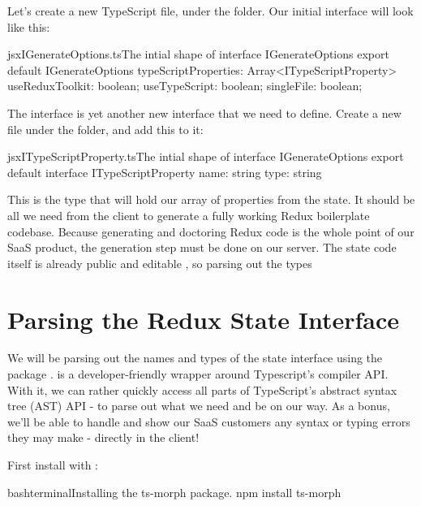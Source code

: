 \documentclass[paper=6in:9in,pagesize=pdftex,headinclude=on,footinclude=on,12pt]{scrbook}
\begin{document}
Let's create a new TypeScript file,  under the  folder. Our initial  interface will look like this:

\begin{codeInput}{jsx}{IGenerateOptions.ts}{The intial shape of interface IGenerateOptions}
export default IGenerateOptions {
  typeScriptProperties: Array<ITypeScriptProperty>
  useReduxToolkit: boolean;
  useTypeScript: boolean;
  singleFile: boolean;
}
\end{codeInput}

The interface  is yet another new interface that we need to define. Create a new file  under the  folder, and add this to it:

\begin{codeInput}{jsx}{ITypeScriptProperty.ts}{The intial shape of interface IGenerateOptions}
export default interface ITypeScriptProperty {
  name: string
  type: string
}
\end{codeInput}

This is the type that will hold our array of properties from the state. It should be all we need from the client to generate a fully working Redux boilerplate codebase. Because generating and doctoring Redux code is the whole point of our SaaS product, the generation step must be done on our server. The state code itself is already public and editable , so parsing out the types 

\section{Parsing the Redux State Interface}

We will be parsing out the names and types of the state interface using the package .  is a developer-friendly wrapper around Typescript's compiler API. With it, we can rather quickly access all parts of TypeScript's abstract syntax tree (AST) API - to parse out what we need and be on our way. As a bonus, we'll be able to handle and show our SaaS customers any syntax or typing errors they may make - directly in the client!


First install  with :

\begin{codeInput}{bash}{terminal}{Installing the ts-morph package.}
npm install ts-morph
\end{codeInput}
\end{document}
